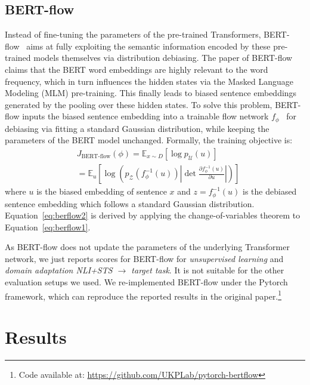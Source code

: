\documentclass[11pt]{article}
\begin{document}
\subsection{BERT-flow}
Instead of fine-tuning the parameters of the pre-trained Transformers, BERT-flow~\citep{DBLP:conf/emnlp/LiZHWYL20} aims at fully exploiting the semantic information encoded by these pre-trained models themselves via distribution debiasing. The paper of BERT-flow claims that the BERT word embeddings are highly relevant to the word frequency, which in turn influences the hidden states via the Masked Language Modeling (MLM) pre-training. This finally leads to biased sentence embeddings generated by the pooling over these hidden states. To solve this problem, BERT-flow inputs the biased sentence embedding into a trainable flow network $f_\phi$~\citep{DBLP:conf/nips/KingmaD18} for debiasing via fitting a standard Gaussian distribution, while keeping the parameters of the BERT model unchanged. Formally, the training objective is:
\begin{align}
    &J_{\mathrm{BERT}\text{-}\mathrm{flow}}(\phi) = \mathbb{E}_{x\sim D}[\log p_{\mathcal{U}}(u)] \label{eq:berflow1} \\
                          & = \mathbb{E}_u[\log(p_{\mathcal{Z}}(f_\phi^{-1}(u))|\det \frac{\partial f_\phi^{-1}(u)}{\partial u}|)] \label{eq:berflow2}
\end{align}
where $u$ is the biased embedding of sentence $x$ and $z=f_\phi^{-1}(u)$ is the debiased sentence embedding which follows a standard Gaussian distribution. Equation~\ref{eq:berflow2} is derived by applying the change-of-variables theorem to Equation~\ref{eq:berflow1}.

As BERT-flow does not update the parameters of the underlying Transformer network, we just reports scores for BERT-flow for \textit{unsupervised learning} and \textit{domain adaptation NLI+STS $\to$ target task}. It is not suitable for the other evaluation setups we used. We re-implemented BERT-flow under the Pytorch framework, which can reproduce the reported results in the original paper.\footnote{Code available at: \url{https://github.com/UKPLab/pytorch-bertflow}}


\section{Results}
\label{sec:results}
\end{document}

